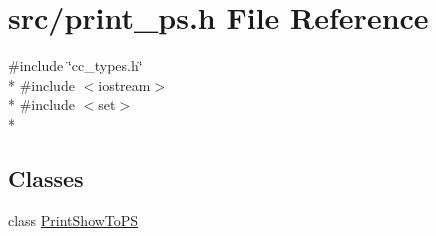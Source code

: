 \hypertarget{a00239}{\section{src/print\-\_\-ps.h File Reference}
\label{a00239}
}
{\ttfamily \#include \char`\"{}cc\-\_\-types.\-h\char`\"{}}\\*
{\ttfamily \#include $<$iostream$>$}\\*
{\ttfamily \#include $<$set$>$}\\*
\subsection*{Classes}
\begin{DoxyCompactItemize}
\item 
class \hyperlink{a00118}{Print\-Show\-To\-P\-S}
\end{DoxyCompactItemize}
